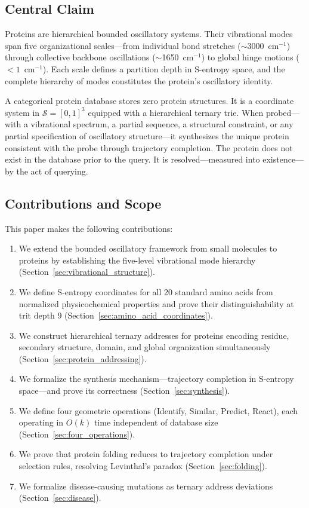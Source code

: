 \documentclass[11pt,twocolumn,a4paper]{article}
\theoremstyle{definition}
\theoremstyle{remark}
\newcommand{\Sspace}{\mathcal{S}}
\begin{document}
\subsection{Central Claim}

Proteins are hierarchical bounded oscillatory systems. Their vibrational modes span five organizational scales---from individual bond stretches ($\sim$3000~cm$^{-1}$) through collective backbone oscillations ($\sim$1650~cm$^{-1}$) to global hinge motions ($< 1$~cm$^{-1}$). Each scale defines a partition depth in S-entropy space, and the complete hierarchy of modes constitutes the protein's oscillatory identity.

A categorical protein database stores zero protein structures. It is a coordinate system in $\Sspace = [0,1]^3$ equipped with a hierarchical ternary trie. When probed---with a vibrational spectrum, a partial sequence, a structural constraint, or any partial specification of oscillatory structure---it synthesizes the unique protein consistent with the probe through trajectory completion. The protein does not exist in the database prior to the query. It is resolved---measured into existence---by the act of querying.

\subsection{Contributions and Scope}

This paper makes the following contributions:

\begin{enumerate}[nosep]
\item We extend the bounded oscillatory framework from small molecules to proteins by establishing the five-level vibrational mode hierarchy (Section~\ref{sec:vibrational_structure}).
\item We define S-entropy coordinates for all 20 standard amino acids from normalized physicochemical properties and prove their distinguishability at trit depth 9 (Section~\ref{sec:amino_acid_coordinates}).
\item We construct hierarchical ternary addresses for proteins encoding residue, secondary structure, domain, and global organization simultaneously (Section~\ref{sec:protein_addressing}).
\item We formalize the synthesis mechanism---trajectory completion in S-entropy space---and prove its correctness (Section~\ref{sec:synthesis}).
\item We define four geometric operations (Identify, Similar, Predict, React), each operating in $O(k)$ time independent of database size (Section~\ref{sec:four_operations}).
\item We prove that protein folding reduces to trajectory completion under selection rules, resolving Levinthal's paradox (Section~\ref{sec:folding}).
\item We formalize disease-causing mutations as ternary address deviations (Section~\ref{sec:disease}).
\end{enumerate}
\end{document}
